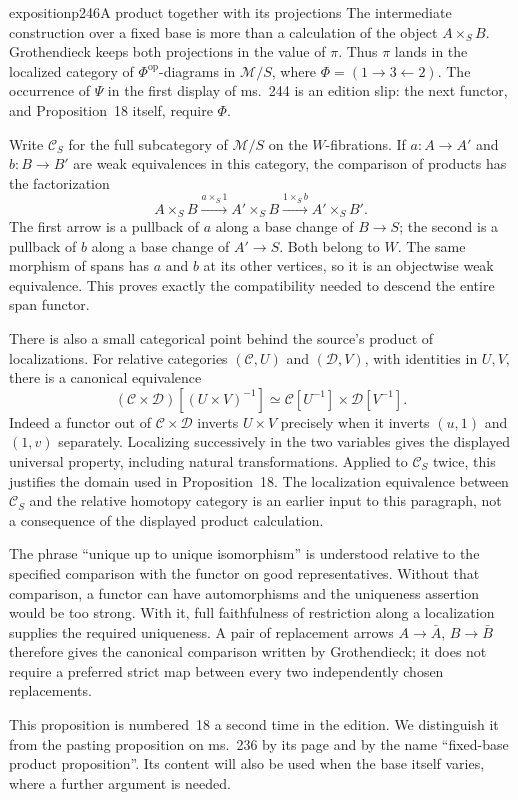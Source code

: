 \begin{dcomment}{exposition}{p246}{A product together with its projections}
The intermediate construction over a fixed base is more than a calculation of the object $A\times_S B$. Grothendieck keeps both projections in the value of $\pi$. Thus $\pi$ lands in the localized category of $\Phi^{\mathrm{op}}$-diagrams in $\mathcal M/S$, where $\Phi=(1\to3\leftarrow2)$. The occurrence of $\Psi$ in the first display of ms.~244 is an edition slip: the next functor, and Proposition~18 itself, require $\Phi$.

Write $\mathcal C_S$ for the full subcategory of $\mathcal M/S$ on the $W$-fibrations. If $a:A\to A'$ and $b:B\to B'$ are weak equivalences in this category, the comparison of products has the factorization
\[
 A\times_S B\xrightarrow{a\times_S1}
 A'\times_S B\xrightarrow{1\times_S b}
 A'\times_S B'.
\]
The first arrow is a pullback of $a$ along a base change of $B\to S$; the second is a pullback of $b$ along a base change of $A'\to S$. Both belong to $W$. The same morphism of spans has $a$ and $b$ at its other vertices, so it is an objectwise weak equivalence. This proves exactly the compatibility needed to descend the entire span functor.

There is also a small categorical point behind the source's product of localizations. For relative categories $(\mathcal C,U)$ and $(\mathcal D,V)$, with identities in $U,V$, there is a canonical equivalence
\[
 (\mathcal C\times\mathcal D)[(U\times V)^{-1}]
 \simeq\mathcal C[U^{-1}]\times\mathcal D[V^{-1}].
\]
Indeed a functor out of $\mathcal C\times\mathcal D$ inverts $U\times V$ precisely when it inverts $(u,1)$ and $(1,v)$ separately. Localizing successively in the two variables gives the displayed universal property, including natural transformations. Applied to $\mathcal C_S$ twice, this justifies the domain used in Proposition~18. The localization equivalence between $\mathcal C_S$ and the relative homotopy category is an earlier input to this paragraph, not a consequence of the displayed product calculation.

The phrase ``unique up to unique isomorphism'' is understood relative to the specified comparison with the functor on good representatives. Without that comparison, a functor can have automorphisms and the uniqueness assertion would be too strong. With it, full faithfulness of restriction along a localization supplies the required uniqueness. A pair of replacement arrows $A\to\bar A$, $B\to\bar B$ therefore gives the canonical comparison written by Grothendieck; it does not require a preferred strict map between every two independently chosen replacements.

This proposition is numbered~18 a second time in the edition. We distinguish it from the pasting proposition on ms.~236 by its page and by the name ``fixed-base product proposition''. Its content will also be used when the base itself varies, where a further argument is needed.
\end{dcomment}


